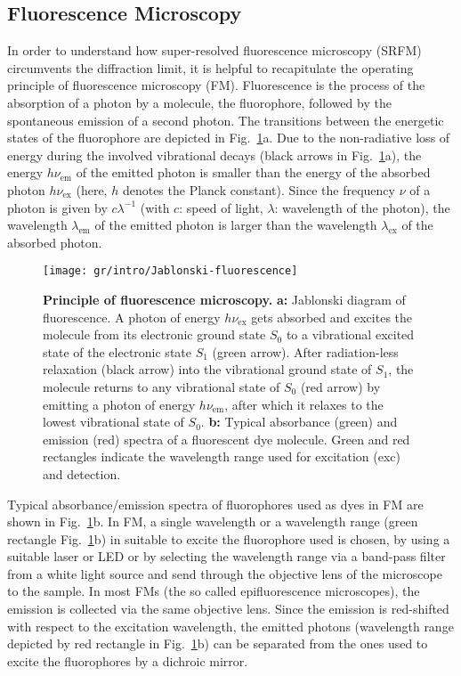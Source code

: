 
\subsection{Fluorescence Microscopy}
\label{sec:fm}
In order to understand how super-resolved fluorescence microscopy (SRFM)
circumvents the diffraction limit, it is helpful to recapitulate the operating
principle of fluorescence microscopy (FM). Fluorescence is the process of the
absorption of a photon by a molecule, the fluorophore, followed by the
spontaneous emission of a second photon. The transitions between the energetic
states of the fluorophore are depicted in
Fig.~\ref{fig:jablonski-fluorescence}a. Due to the non-radiative loss of
energy during the involved vibrational decays (black arrows in
Fig.~\ref{fig:jablonski-fluorescence}a), the energy $h\nu_\text{em}$ of the
emitted photon is smaller than the energy of the absorbed photon
$h\nu_\text{ex}$ (here, $h$ denotes the Planck constant). Since the frequency $\nu$
of a photon is given by $c\lambda^{-1}$ (with $c$: speed of light, $\lambda$:
wavelength of the photon), the wavelength $\lambda_\text{em}$ of the emitted
photon is larger than the wavelength $\lambda_\text{ex}$ of the absorbed
photon.      

\begin{figure}
  \centering
  \texttt{[image: gr/intro/Jablonski-fluorescence]}
  
  \caption{%
    \textbf{Principle of fluorescence microscopy.}
    \textbf{a:}
      Jablonski diagram of fluorescence. A photon of energy
      $h\nu_\text{ex}$ gets absorbed and excites the molecule from its
      electronic ground state $S_0$ to a vibrational excited state of the
      electronic state $S_1$ (green arrow). After radiation-less relaxation
      (black arrow) into the vibrational ground state of $S_1$, the molecule
      returns to any vibrational state of $S_0$ (red arrow) by emitting a photon
      of energy $h\nu_\text{em}$, after which it relaxes to the lowest
      vibrational state of $S_0$.
    \textbf{b:}
      Typical absorbance (green) and
      emission (red) spectra of a fluorescent dye molecule. Green and red
      rectangles indicate the wavelength range used for excitation (exc) and
      detection.
  }
  \label{fig:jablonski-fluorescence}
\end{figure}

Typical absorbance/emission spectra of fluorophores used as dyes in FM are
shown in Fig.~\ref{fig:jablonski-fluorescence}b. In FM, a single wavelength or
a wavelength range (green rectangle Fig.~\ref{fig:jablonski-fluorescence}b) in
suitable to excite the fluorophore used is chosen, by using a suitable laser
or LED or by selecting the wavelength range via a band-pass filter from a
white light source and send through the objective lens of the microscope to
the sample. In most FMs (the so called epifluorescence microscopes), the
emission is collected via the same objective lens. Since the emission is
red-shifted with respect to the excitation wavelength, the emitted photons
(wavelength range depicted by red rectangle in
Fig.~\ref{fig:jablonski-fluorescence}b) can be separated from the ones used to
excite the fluorophores by a dichroic mirror.

